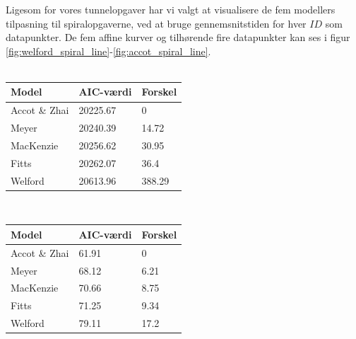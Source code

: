 Ligesom for vores tunnelopgaver har vi valgt at visualisere de fem modellers tilpasning til spiralopgaverne, ved at bruge gennemsnitstiden for hver $ID$ som datapunkter. De fem affine kurver og tilhørende fire datapunkter kan ses i figur \ref{fig:welford_spiral_line}-\ref{fig:accot_spiral_line}.\\\\
\begin{minipage}[t]{\linewidth}
	\begin{minipage}[t]{0.45\linewidth}
		\begin{tabular}{lll}
			Model & AIC-værdi & Forskel\\\hline
			Accot \& Zhai & 20225.67 & 0\\
			Meyer & 20240.39 & 14.72 \\
			MacKenzie & 20256.62 & 30.95\\
			Fitts & 20262.07 & 36.4\\
			Welford & 20613.96 & 388.29
		\end{tabular}
		\label{tab:table_analysis_aic_spiral_all}
	\end{minipage}
	\begin{minipage}[t]{0.1\linewidth}
	~
	\end{minipage}
	\begin{minipage}[t]{0.45\linewidth}
		\begin{tabular}{lll}
			Model & AIC-værdi & Forskel\\\hline
			Accot \& Zhai & 61.91 & 0\\
			Meyer & 68.12 & 6.21 \\
			MacKenzie & 70.66 & 8.75\\
			Fitts & 71.25 & 9.34\\
			Welford & 79.11 & 17.2
		\end{tabular}
		\label{tab:table_analysis_aic_spiral_mean}
	\end{minipage}
\end{minipage}\\\\
